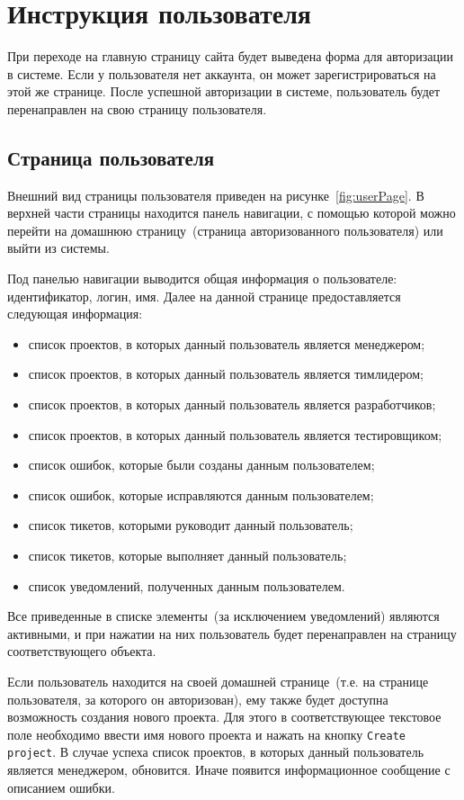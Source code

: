 \section{Инструкция пользователя}
При переходе на главную страницу сайта будет выведена форма для авторизации в системе. Если у пользователя нет аккаунта, он может зарегистрироваться на этой же странице. После успешной авторизации в системе, пользователь будет перенаправлен на свою страницу пользователя.

\subsection{Страница пользователя}
Внешний вид страницы пользователя приведен на рисунке~\ref{fig:userPage}. В верхней части страницы находится панель навигации, с помощью которой можно перейти на домашнюю страницу~(страница авторизованного пользователя) или выйти из системы. 

Под панелью навигации выводится общая информация о пользователе: идентификатор, логин, имя. Далее на данной странице предоставляется следующая информация:
\begin{itemize}
	\item список проектов, в которых данный пользователь является менеджером;
	\item список проектов, в которых данный пользователь является тимлидером;
	\item список проектов, в которых данный пользователь является разработчиков;
	\item список проектов, в которых данный пользователь является тестировщиком;
	\item список ошибок, которые были созданы данным пользователем;
	\item список ошибок, которые исправляются данным пользователем;
	\item список тикетов, которыми руководит данный пользователь;
	\item список тикетов, которые выполняет данный пользователь;
	\item список уведомлений, полученных данным пользователем.
\end{itemize}

Все приведенные в списке элементы~(за исключением уведомлений) являются активными, и при нажатии на них пользователь будет перенаправлен на страницу соответствующего объекта.

Если пользователь находится на своей домашней странице~(т.е. на странице пользователя, за которого он авторизован), ему также будет доступна возможность создания нового проекта. Для этого в соответствующее текстовое поле необходимо ввести имя нового проекта и нажать на кнопку \texttt{Create project}. В случае успеха список проектов, в которых данный пользователь является менеджером, обновится. Иначе появится информационное сообщение с описанием ошибки.

